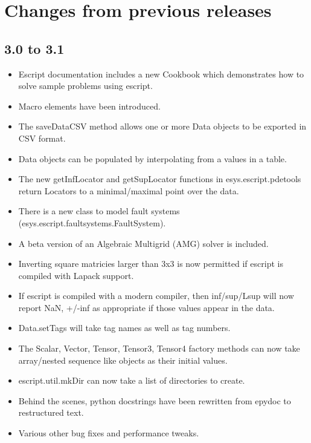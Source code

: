 
%
%
%

\section{Changes from previous releases}
\label{app:changes}

\subsection*{3.0 to 3.1}
\begin{itemize}
 \item Escript documentation includes a new Cookbook which demonstrates how to solve sample problems using escript.
\item Macro elements have been introduced.
\item The saveDataCSV method allows one or more Data objects to be exported in CSV format.
\item Data objects can be populated by interpolating from a values in a table.
\item The new getInfLocator and getSupLocator functions in esys.escript.pdetools return Locators to a minimal/maximal point over the data.
\item There is a new class to model fault systems (esys.escript.faultsystems.FaultSystem).
\item A beta version of an Algebraic Multigrid (AMG) solver is included.
\item Inverting square matricies larger than 3x3 is now permitted if escript is compiled with Lapack support.
\item If escript is compiled with a modern compiler, then inf/sup/Lsup will now report NaN, +/-inf as appropriate if those values appear in the data.
\item Data.setTags will take tag names as well as tag numbers.
\item The Scalar, Vector, Tensor, Tensor3, Tensor4 factory methods can now take array/nested sequence like objects as their initial values.
\item escript.util.mkDir can now take a list of directories to create.
\item Behind the scenes, python docstrings have been rewritten from epydoc to restructured text.
\item Various other bug fixes and performance tweaks.
\end{itemize}


